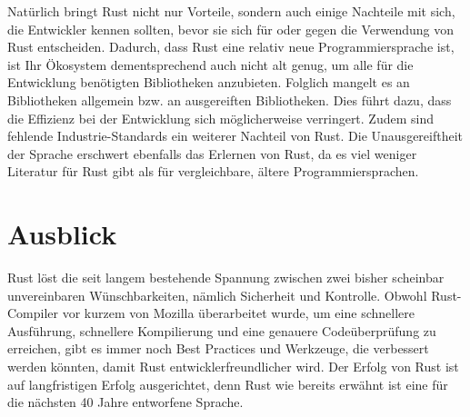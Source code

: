 Natürlich bringt Rust nicht nur Vorteile, sondern auch einige Nachteile mit sich, die Entwickler kennen sollten, bevor sie sich für oder gegen die Verwendung von Rust entscheiden. Dadurch, dass Rust eine relativ neue Programmiersprache ist, ist Ihr Ökosystem dementsprechend auch nicht alt genug, um alle für die Entwicklung benötigten Bibliotheken anzubieten. Folglich mangelt es an Bibliotheken allgemein bzw. an ausgereiften Bibliotheken. Dies führt dazu, dass die Effizienz bei der Entwicklung sich möglicherweise verringert. Zudem sind fehlende Industrie-Standards ein weiterer Nachteil von Rust. Die Unausgereiftheit der Sprache erschwert ebenfalls das Erlernen von Rust, da es viel weniger Literatur für Rust gibt als für vergleichbare, ältere Programmiersprachen.    


\section{Ausblick}

Rust löst die seit langem bestehende Spannung zwischen zwei bisher scheinbar unvereinbaren Wünschbarkeiten, nämlich Sicherheit und Kontrolle. Obwohl Rust-Compiler vor kurzem von Mozilla überarbeitet wurde, um eine schnellere Ausführung, schnellere Kompilierung und eine genauere Codeüberprüfung zu erreichen,\autocite{rust-language-doubles-down-speed} gibt es immer noch Best Practices und Werkzeuge, die verbessert werden könnten, damit Rust entwicklerfreundlicher wird. Der Erfolg von Rust ist auf langfristigen Erfolg ausgerichtet, denn Rust wie bereits erwähnt ist eine für die nächsten 40 Jahre entworfene Sprache.



